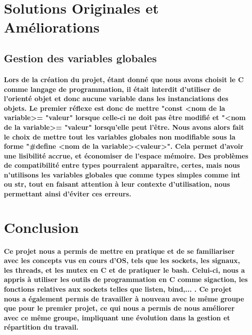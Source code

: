 \documentclass[utf8]{article}
\begin{document}
\section{Solutions Originales et Améliorations}
\subsection{Gestion des variables globales}
\paragraph{Lors de la création du projet, étant donné que nous avons choisit le C comme langage de programmation, il était interdit 
d'utiliser de l'orienté objet et donc aucune variable dans les instanciations des objets. Le premier réflexe est donc de mettre
"const \textless nom de la variable\textgreater  = "valeur" lorsque celle-ci ne doit pas être modifié et "\textless nom de la variable\textgreater = "valeur" lorsqu'elle 
peut l'être. Nous avons alors fait le choix de mettre tout les variables globales non modifiable sous la forme 
"\#define \textless nom de la variable\textgreater \textless valeur\textgreater". Cela permet d'avoir une lisibilité accrue, et économiser de l'espace mémoire. Des
problèmes de compatibilité entre types pourraient apparaître, certes, mais nous n'utilisons les variables globales que comme types simples comme int ou str, tout en
faisant attention à leur contexte d'utilisation, nous permettant ainsi d'éviter ces erreurs.}

\section{Conclusion}
\paragraph{Ce projet nous a permis de mettre en pratique et de se familiariser avec les concepts vus en cours d'OS,
tels que les sockets, les signaux, les threads, et les mutex en C et de pratiquer le bash.
Celui-ci, nous a appris à utiliser les outils de programmation en C comme sigaction, les fonctions relatives aux sockets telles que listen, bind,... .
Ce projet nous a également permis de travailler à nouveau avec le même groupe que pour le premier projet, ce qui nous a permis de nous 
améliorer avec ce même groupe, impliquant une évolution dans la gestion et répartition du travail.}
\end{document}
